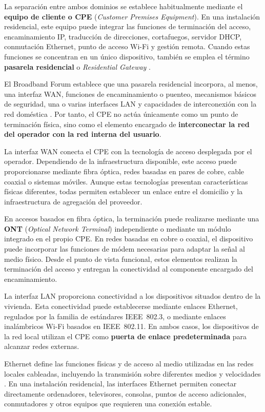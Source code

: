 La separación entre ambos dominios se establece habitualmente mediante
el \textbf{equipo de cliente o CPE}
(\textit{Customer Premises Equipment}). En una instalación residencial,
este equipo puede integrar las funciones de terminación del acceso,
encaminamiento IP, traducción de direcciones, cortafuegos, servidor DHCP,
conmutación Ethernet, punto de acceso Wi-Fi y gestión remota. Cuando
estas funciones se concentran en un único dispositivo, también se emplea
el término \textbf{pasarela residencial} o
\textit{Residential Gateway} \cite{bbf_tr124_i9}.

El Broadband Forum establece que una pasarela residencial incorpora, al
menos, una interfaz WAN, funciones de encaminamiento o puenteo,
mecanismos básicos de seguridad, una o varias interfaces LAN y
capacidades de interconexión con la red doméstica
\cite{bbf_tr124_i9}. Por tanto, el CPE no actúa únicamente como un punto
de terminación física, sino como el elemento encargado de
\textbf{interconectar la red del operador con la red interna del
usuario}.

La interfaz WAN conecta el CPE con la tecnología de acceso desplegada por
el operador. Dependiendo de la infraestructura disponible, este acceso
puede proporcionarse mediante fibra óptica, redes basadas en pares de
cobre, cable coaxial o sistemas móviles. Aunque estas tecnologías
presentan características físicas diferentes, todas permiten establecer
un enlace entre el domicilio y la infraestructura de agregación del
proveedor.

En accesos basados en fibra óptica, la terminación puede realizarse
mediante una \textbf{ONT}
(\textit{Optical Network Terminal}) independiente o mediante un módulo
integrado en el propio CPE. En redes basadas en cobre o coaxial, el
dispositivo puede incorporar las funciones de módem necesarias para
adaptar la señal al medio físico. Desde el punto de vista funcional,
estos elementos realizan la terminación del acceso y entregan la
conectividad al componente encargado del encaminamiento.

La interfaz LAN proporciona conectividad a los dispositivos situados
dentro de la vivienda. Esta conectividad puede establecerse mediante
enlaces Ethernet, regulados por la familia de estándares IEEE~802.3, o
mediante enlaces inalámbricos Wi-Fi basados en IEEE~802.11. En ambos
casos, los dispositivos de la red local utilizan el CPE como
\textbf{puerta de enlace predeterminada} para alcanzar redes externas.

Ethernet define las funciones físicas y de acceso al medio utilizadas en
las redes locales cableadas, incluyendo la transmisión sobre diferentes
medios y velocidades \cite{ieee_8023_2022}. En una instalación
residencial, las interfaces Ethernet permiten conectar directamente
ordenadores, televisores, consolas, puntos de acceso adicionales,
conmutadores y otros equipos que requieren una conexión estable.

